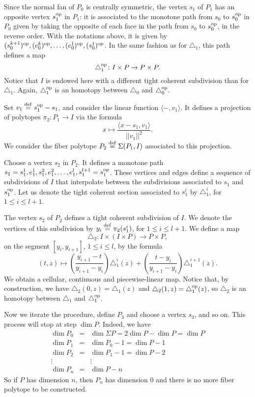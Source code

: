 Since the normal fan of $P_0$ is centrally symmetric, the vertex $s_1$ of $P_1$ has an opposite vertex $s_1^{\mathrm{op}}$ in $P_1$: it is associated to the monotone path from $s_0$ to $s_0^{\mathrm{op}}$ in $P_0$ given by taking the opposite of each face in the path from $s_0$ to $s^{\mathrm{op}}_0$, in the reverse order.
With the notations above, it is given by $(s_0^{k+1})^{\mathrm{op}},(e_0^k)^{\mathrm{op}},\ldots,(e_0^1)^{\mathrm{op}},(s_0^1)^{\mathrm{op}}$.
In the same fashion as for $\triangle_1$, this path defines a map
\[
\triangle_1^{\mathrm{op}} \colon I \times P \to P \times P.
\]
Notice that $I$ is endowed here with a different tight coherent subdivision than for $\triangle_1$.
Again, $\triangle_1^{\mathrm{op}}$ is an homotopy between $\triangle_0$ and $\triangle_0^{\mathrm{op}}$.

Set $v_1 \stackrel{\mathrm{def}}{=} s_1^{\mathrm{op}}-s_1$, and consider the linear function $\langle - , v_1 \rangle$.
It defines a projection of polytopes $\pi_2 \colon P_1 \to I$ via the formula
\[
x \mapsto \frac{\langle x-s_1, v_1 \rangle}{||v_1||^2}.
\]
We consider the fiber polytope $P_2 \stackrel{\mathrm{def}}{=} \Sigma(P_1,I)$ associated to this projection.

Choose a vertex $s_2$ in $P_2$. It defines a monotone path $s_1 = s_1^1, e_1^1, s_1^2, e_1^2, \dots, e_1^l, s_1^{l+1} = s^{\mathrm{op}}_1$.
These vertices and edges define a sequence of subdivisions of $I$ that interpolate between the subdivisions associated to $s_1$ and $s_1^{\mathrm{op}}$.
Let us denote the tight coherent section associated to $s_1^i$ by $\triangle_1^i$, for $1\leq i \leq l+1$.

The vertex $s_2$ of $P_2$ defines a tight coherent subdivision of $I$.
We denote the vertices of this subdivision by $y_i \stackrel{\mathrm{def}}{=} \pi_2(s_1^i)$, for $1 \leq i \leq l+1$.
We define a map
\[
\triangle_2 \colon I \times (I \times P) \to P \times P,
\]
on the segment $[y_i,y_{i+1}]$, $1 \leq i \leq l$, by the formula
\[
(t,z) \mapsto \left(\frac{y_{i+1}-t}{y_{i+1}-y_i}\right)\triangle_1^{i}(z)+\left(\frac{t-y_{i}}{y_{i+1}-y_i}\right)\triangle_1^{i+1}(z).
\]
We obtain a cellular, continuous and piecewise-linear map.
Notice that, by construction, we have $\triangle_2(0,z)=\triangle_1(z)$ and $\triangle_2(1,z)=\triangle_1^{\mathrm{op}}(z)$, so $\triangle_2$ is an homotopy between $\triangle_1$ and $\triangle_1^{\mathrm{op}}$.

Now we iterate the procedure, define $P_3$ and choose a vertex $s_3$, and so on.
This process will stop at step $\dim P$.
Indeed, we have
\begin{eqnarray*}
    \dim P_0 & = & \dim \Sigma P = 2 \dim P - \dim P = \dim P \\
    \dim P_1 & = & \dim P_0 -1 = \dim P -1 \\
    \dim P_2 & = & \dim P_1 - 1 = \dim P -2 \\
    \vdots & & \vdots  \\
    \dim P_n & = &\dim P - n
\end{eqnarray*}
So if $P$ has dimension $n$, then $P_n$ has dimension 0 and there is no more fiber polytope to be constructed.

